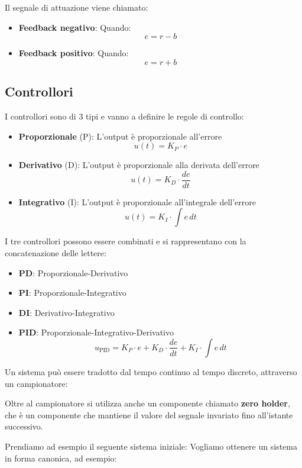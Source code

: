 \documentclass[a4paper]{article}
\begin{document}
Il segnale di attuazione viene chiamato:
\begin{itemize}
  \item \textbf{Feedback negativo}: Quando:
    \[
    e = r-b
    \] 
  \item \textbf{Feedback positivo}: Quando:
    \[
    e = r+b
    \] 
\end{itemize}

\subsection{Controllori}
I controllori sono di 3 tipi e vanno a definire le regole di controllo:
\begin{itemize}
  \item \textbf{Proporzionale} (P): L'output è proporzionale all'errore
    \[
      u(t) = K_P \cdot e
    \]

  \item \textbf{Derivativo} (D): L'output è proporzionale alla derivata dell'errore
    \[
      u(t) = K_D \cdot \frac{de}{dt}
    \]

  \item \textbf{Integrativo} (I): L'output è proporzionale all'integrale dell'errore
    \[
      u(t) = K_I \cdot \int e \, dt
    \]
\end{itemize}
I tre controllori possono essere combinati e si rappresentano con la concatenazione
delle lettere:
\begin{itemize}
  \item \textbf{PD}: Proporzionale-Derivativo
  \item \textbf{PI}: Proporzionale-Integrativo
  \item \textbf{DI}: Derivativo-Integrativo
  \item \textbf{PID}: Proporzionale-Integrativo-Derivativo
    \[
      u_{\text{PID}} = K_P \cdot e + K_D \cdot \frac{de}{dt} + K_I \cdot \int e \, dt
    \] 
\end{itemize}

\vspace{1em}
\noindent
Un sistema può essere tradotto dal tempo continuo al tempo discreto, attraverso un
campionatore:
\label{25-11-D8}

\noindent
Oltre al campionatore si utilizza anche un componente chiamato \textbf{zero holder},
che è un componente che mantiene il valore del segnale invariato fino all'istante
successivo.
\label{25-11-D9}

\begin{example}
  Prendiamo ad esempio il seguente sistema iniziale:
  \label{25-11-D10}
  \noindent
  Vogliamo ottenere un sistema in forma canonica, ad esempio:
  \label{25-11-D11}
  
\end{example}
\end{document}
